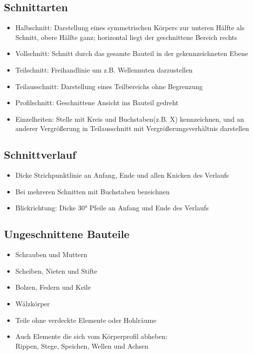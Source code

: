 \documentclass[a4paper,parskip=half*,DIV=7,fontsize=11pt]{scrartcl}
\begin{document}
\subsection{Schnittarten}
\begin{itemize}
	\item Halbschnitt: Darstellung eines symmetrischen Körpers zur unteren Hälfte als Schnitt, obere Hälfte ganz; horizontal liegt der geschnittene Bereich rechts
	\item Vollschnitt: Schnitt durch das gesamte Bauteil in der gekennzeichneten Ebene
	\item Teilschnitt: Freihandlinie um z.B. Wellennuten darzustellen
	\item Teilausschnitt: Darstellung eines Teilbereichs ohne Begrenzung
	\item Profilschnitt: Geschnittene Ansicht ins Bauteil gedreht
	\item Einzelheiten: Stelle mit Kreis und Buchstaben(z.B. X) kennzeichnen, und an anderer Vergrößerung in Teilausschnitt mit Vergrößerungsverhältnis darstellen 
\end{itemize}

\subsection{Schnittverlauf}
\begin{itemize}
	\item Dicke Strichpunktlinie an Anfang, Ende und allen Knicken des Verlaufs
	\item Bei mehreren Schnitten mit Buchstaben bezeichnen
	\item Blickrichtung: Dicke 30° Pfeile an Anfang und Ende des Verlaufs
\end{itemize}
		
\subsection{Ungeschnittene Bauteile}
\begin{itemize}
	\item Schrauben und Muttern
	\item Scheiben, Nieten und Stifte
	\item Bolzen, Federn und Keile
	\item Wälzkörper
	\item Teile ohne verdeckte Elemente oder Hohlräume
	\item Auch Elemente die sich vom Körperprofil abheben:\\
	      Rippen, Stege, Speichen, Wellen und Achsen
\end{itemize}
	
\end{document}
